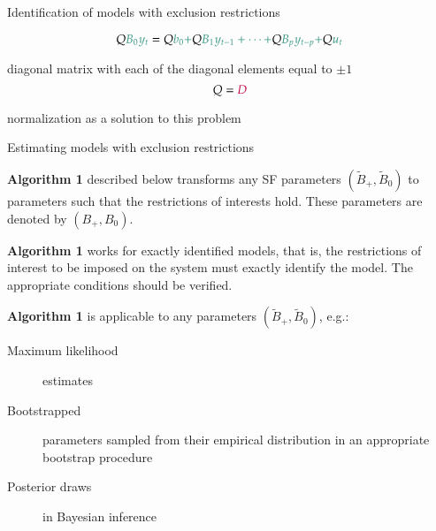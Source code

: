 \documentclass[notes,blackandwhite,mathsans,usenames,dvipsnames]{beamer}
\begin{document}
\begin{frame}{Identification of models with exclusion restrictions}



$$ Q{\color{mcxs2}B_0y_t} = Q{\color{mcxs2}b_0 +} Q{\color{mcxs2}B_1y_{t-1}+ \dots +} Q{\color{mcxs2}B_py_{t-p} +} Q{\color{mcxs2}u_t} $$

\small
{}

 {\color{purple}diagonal matrix with each of the diagonal elements equal to} $\pm1$
\normalsize
$$ Q={\color{purple}D} $$

\small
{}

 {\color{purple}normalization} {\color{mcxs2}as a solution to this problem}

\end{frame}









\begin{frame}{Estimating models with exclusion restrictions}

\textbf{Algorithm 1} {\color{mcxs2}described below transforms any SF parameters} $(\tilde{B}_+,\tilde{B}_0)$ {\color{mcxs2}to parameters such that the restrictions of interests hold. These parameters are denoted by} $(B_+,B_0)$.

\bigskip\textbf{Algorithm 1} {\color{purple}works for exactly identified models}{\color{mcxs2}, that is, the restrictions of interest to be imposed on the system must exactly identify the model. The appropriate conditions should be verified.}

\bigskip\textbf{Algorithm 1} {\color{mcxs2}is applicable to any parameters} $(\tilde{B}_+,\tilde{B}_0)$, e.g.:
\begin{description}
\item[Maximum likelihood] {\color{mcxs2}estimates}
\item[Bootstrapped] {\color{mcxs2}parameters sampled from their empirical distribution in an appropriate bootstrap procedure}
\item[Posterior draws] {\color{mcxs2}in Bayesian inference}
\end{description}
\end{frame}
\end{document}
